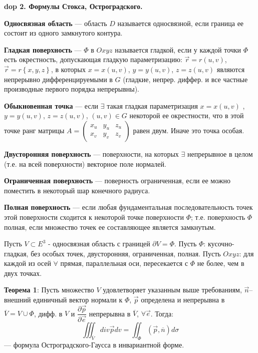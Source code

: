 \setcounter{section}{4}
\setcounter{subsection}{2}
\setcounter{equation}{0}
\textbf{\LARGE dop 2. Формулы Стокса, Остроградского.}

\par \textbf{Односвязная область} --- область $D$ называется односвязной, если
граница ее состоит из одного замкнутого контура.

\par \textbf{Гладкая поверхность} --- $\Phi$ в $Oxyz$ называется гладкой, если у каждой точки $\Phi$ есть окрестность, допускающая гладкую параметризацию: $\overrightarrow{r}=r\left( u,v\right)$,  $\overrightarrow{r}=r\left\{ x,y,z\right\}$, в которых $x = x\left( u,v\right)$, $y = y\left( u,v\right)$, $z = z\left( u,v\right)$ являются непрерывно дифференцируемыми в $G$ (гладкие, непрер. диффер. и все частные производные первого порядка непрерывны).

\par \textbf{Обыкновенная точка} --- если $\exists$ такая гладкая параметризация $x = x\left( u,v\right)$ , $y = y\left( u,v\right)$, $z = z\left( u,v\right)$, $\left( u,v\right) \in G$ некоторой ее окрестности, что в этой точке ранг матрицы $A=\begin{pmatrix} x_{u} & y_{u} & z_{u} \\ x_{v} & y_{v} & z_{v} \end{pmatrix}$ равен двум. Иначе это точка особая.

\par \textbf{Двусторонняя поверхность} --- поверхности, на которых $\exists$ непрерывное в целом (т.е. на всей поверхности) векторное поле нормалей.

\par \textbf{Ограниченная поверхность} --- поверность ограниченная, если ее можно поместить в некоторый шар конечного радиуса.

\par \textbf{Полная поверхность} --- если любая фундаментальная последовательность точек этой поверхности сходится к некоторой точке поверхности $\Phi$; т.е. поверхность $\Phi$ полная, если множество точек ее составляющее является замкнутым.

\par Пусть $V\subset E^{3}$ - односвязная область с границей $\partial V=\Phi $. Пусть $\Phi$: кусочно-гладкая, без особых точек, двусторонняя, ограниченная, полная. Пусть $Oxyz$: для каждой из осей $\forall$ прямая, параллельная оси, пересекается с $\Phi$ не более, чем в двух точках.
\par \textbf{Теорема 1}: Пусть множество $V$ удовлетворяет указанным выше требованиям, $\overrightarrow{n}$– внешний единичный вектор нормали к $\Phi$, $\overrightarrow{p}$ определена и непрерывна в $\overline{V}=V\cup \Phi$, дифф. в $V$ и $\dfrac{\partial \overrightarrow{p}}{\partial \overrightarrow{e}}$ непрерывна в $\overline{V}$, $\forall \overrightarrow{e}$.
Тогда:\begin{equation*} \iiint _{\overline{V}}div\overrightarrow{p}dv=\iint _{\Phi }\left( \overrightarrow{p},\overline{n}\right) d\sigma \end{equation*} --- формула Остроградского-Гаусса в инвариантной форме.

